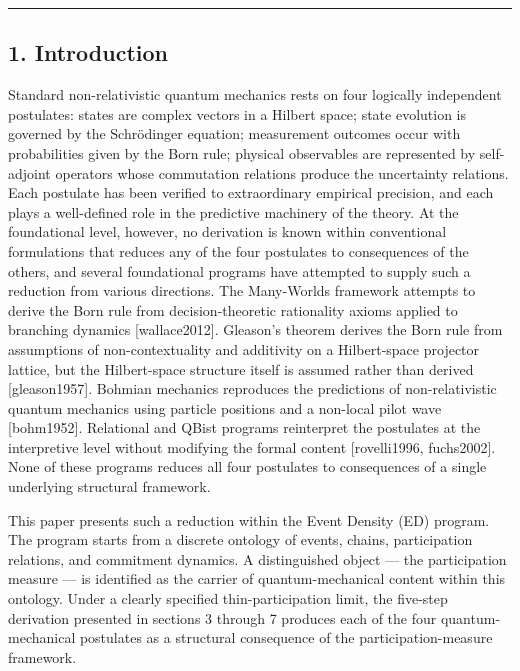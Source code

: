 \documentclass[
  11pt,
]{article}
\begin{document}
\begin{center}\rule{0.5\linewidth}{0.5pt}\end{center}

\subsection{1. Introduction}\label{introduction}

Standard non-relativistic quantum mechanics rests on four logically
independent postulates: states are complex vectors in a Hilbert space;
state evolution is governed by the Schrödinger equation; measurement
outcomes occur with probabilities given by the Born rule; physical
observables are represented by self-adjoint operators whose commutation
relations produce the uncertainty relations. Each postulate has been
verified to extraordinary empirical precision, and each plays a
well-defined role in the predictive machinery of the theory. At the
foundational level, however, no derivation is known within conventional
formulations that reduces any of the four postulates to consequences of
the others, and several foundational programs have attempted to supply
such a reduction from various directions. The Many-Worlds framework
attempts to derive the Born rule from decision-theoretic rationality
axioms applied to branching dynamics {[}wallace2012{]}. Gleason's
theorem derives the Born rule from assumptions of non-contextuality and
additivity on a Hilbert-space projector lattice, but the Hilbert-space
structure itself is assumed rather than derived {[}gleason1957{]}.
Bohmian mechanics reproduces the predictions of non-relativistic quantum
mechanics using particle positions and a non-local pilot wave
{[}bohm1952{]}. Relational and QBist programs reinterpret the postulates
at the interpretive level without modifying the formal content
{[}rovelli1996, fuchs2002{]}. None of these programs reduces all four
postulates to consequences of a single underlying structural framework.

This paper presents such a reduction within the Event Density (ED)
program. The program starts from a discrete ontology of events, chains,
participation relations, and commitment dynamics. A distinguished object
--- the participation measure --- is identified as the carrier of
quantum-mechanical content within this ontology. Under a clearly
specified thin-participation limit, the five-step derivation presented
in sections 3 through 7 produces each of the four quantum-mechanical
postulates as a structural consequence of the participation-measure
framework.
\end{document}
